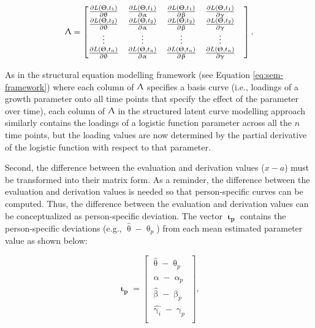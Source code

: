 \documentclass[
12pt, %
twoside,
english]{guelphthesis}
\begin{document}
\[ 
\mathbf{\Uplambda} = 
\begin{bmatrix}
\frac{\partial L(\Uptheta, t_1)}{\partial \uptheta} & \frac{\partial L(\Uptheta, t_1)}{\partial \upalpha}  &  \frac{\partial L(\Uptheta, t_1)}{\partial \upbeta} & \frac{\partial L(\Uptheta, t_1)}{\partial \upgamma}   \\ 
\frac{\partial L(\Uptheta, t_2)}{\partial \uptheta}  & \frac{\partial L(\Uptheta, t_2)}{\partial \upalpha} &  \frac{\partial L(\Uptheta, t_2)}{\partial \upbeta} & \frac{\partial L(\Uptheta, t_2)}{\partial \upgamma} & \\ 
\vdots & \vdots & \vdots & \vdots \\ 
\frac{\partial L(\Uptheta, t_n)}{\partial \uptheta} & \frac{\partial L(\Uptheta, t_n)}{\partial \upalpha}  & \frac{\partial L(\Uptheta, t_n)}{\partial \upbeta} & \frac{\partial L(\Uptheta, t_n)}{\partial \upgamma} \\
\end{bmatrix}.
\]

\noindent As in the structural equation modelling framework (see Equation \ref{eq:sem-framework}) where each column of \(\mathbf{\Uplambda}\) specifies a basis curve (i.e., loadings of a growth parameter onto all time points that specify the effect of the parameter over time), each column of \(\mathbf{\Uplambda}\) in the structured latent curve modelling approach similarly contains the loadings of a logistic function parameter across all the \(n\) time points, but the loading values are now determined by the partial derivative of the logistic function with respect to that parameter.

Second, the difference between the evaluation and derivation values (\(x - a\)) must be transformed into their matrix form. As a reminder, the difference between the evaluation and derivation values is needed so that person-specific curves can be computed. Thus, the difference between the evaluation and derivation values can be conceptualized as person-specific deviation. The vector \(\mathbf{\upiota_p}\) contains the person-specific deviations (e.g., \(\hat{\uptheta} - \uptheta_p\)) from each mean estimated parameter value as shown below:

\[ 
\mathbf{\upiota_p} = 
\begin{bmatrix}
\hat{\uptheta} - \uptheta_p   \\ 
\hat{\upalpha} - \upalpha_p   \\ 
\hat{\upbeta} - \upbeta_p \\ 
\hat{\upgamma_i} - \upgamma_p \\
\end{bmatrix},
\]
\end{document}
